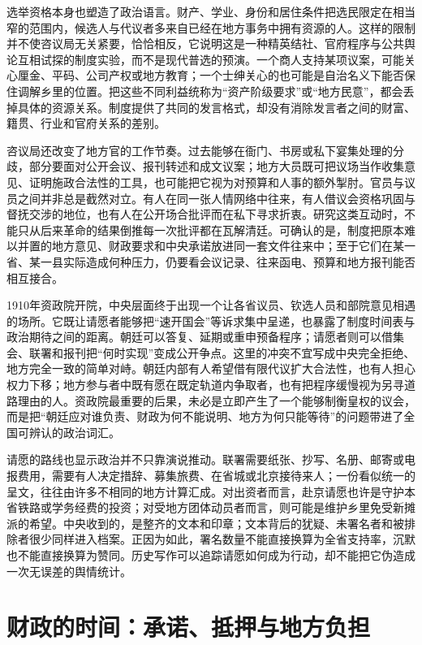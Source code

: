 选举资格本身也塑造了政治语言。财产、学业、身份和居住条件把选民限定在相当窄的范围内，候选人与代议者多来自已经在地方事务中拥有资源的人。这样的限制并不使咨议局无关紧要，恰恰相反，它说明这是一种精英结社、官府程序与公共舆论互相试探的制度实验，而不是现代普选的预演。一个商人支持某项议案，可能关心厘金、平码、公司产权或地方教育；一个士绅关心的也可能是自治名义下能否保住调解乡里的位置。把这些不同利益统称为“资产阶级要求”或“地方民意”，都会丢掉具体的资源关系。制度提供了共同的发言格式，却没有消除发言者之间的财富、籍贯、行业和官府关系的差别。

咨议局还改变了地方官的工作节奏。过去能够在衙门、书房或私下宴集处理的分歧，部分要面对公开会议、报刊转述和成文议案；地方大员既可把议场当作收集意见、证明施政合法性的工具，也可能把它视为对预算和人事的额外掣肘。官员与议员之间并非总是截然对立。有人在同一张人情网络中往来，有人借议会资格巩固与督抚交涉的地位，也有人在公开场合批评而在私下寻求折衷。研究这类互动时，不能只从后来革命的结果倒推每一次批评都在瓦解清廷。可确认的是，制度把原本难以并置的地方意见、财政要求和中央承诺放进同一套文件往来中；至于它们在某一省、某一县实际造成何种压力，仍要看会议记录、往来函电、预算和地方报刊能否相互接合。

1910年资政院开院，中央层面终于出现一个让各省议员、钦选人员和部院意见相遇的场所。它既让请愿者能够把“速开国会”等诉求集中呈递，也暴露了制度时间表与政治期待之间的距离。朝廷可以答复、延期或重申预备程序；请愿者则可以借集会、联署和报刊把“何时实现”变成公开争点。这里的冲突不宜写成中央完全拒绝、地方完全一致的简单对峙。朝廷内部有人希望借有限代议扩大合法性，也有人担心权力下移；地方参与者中既有愿在既定轨道内争取者，也有把程序缓慢视为另寻道路理由的人。资政院最重要的后果，未必是立即产生了一个能够制衡皇权的议会，而是把“朝廷应对谁负责、财政为何不能说明、地方为何只能等待”的问题带进了全国可辨认的政治词汇。

请愿的路线也显示政治并不只靠演说推动。联署需要纸张、抄写、名册、邮寄或电报费用，需要有人决定措辞、募集旅费、在省城或北京接待来人；一份看似统一的呈文，往往由许多不相同的地方计算汇成。对出资者而言，赴京请愿也许是守护本省铁路或学务经费的投资；对受地方团体动员者而言，则可能是维护乡里免受新摊派的希望。中央收到的，是整齐的文本和印章；文本背后的犹疑、未署名者和被排除者很少同样进入档案。正因为如此，署名数量不能直接换算为全省支持率，沉默也不能直接换算为赞同。历史写作可以追踪请愿如何成为行动，却不能把它伪造成一次无误差的舆情统计。

\section{财政的时间：承诺、抵押与地方负担}

